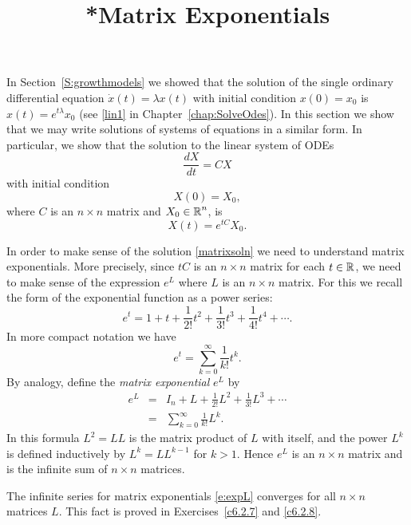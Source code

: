\documentclass{ximera}
\title{*Matrix Exponentials}
\begin{document}
\begin{abstract}
\end{abstract}
\maketitle


\label{S:Matrixexp} 

In Section~\ref{S:growthmodels} we showed that the solution of the single
ordinary differential equation $\dot x(t) = \lambda x(t)$ with initial
condition $x(0)=x_0$ is $x(t) = e^{t\lambda}x_0$ (see \eqref{lin1} in
Chapter~\ref{chap:SolveOdes}).  In this section we show that we
may write solutions of systems of equations in a similar form.
In particular, we show that the solution to the linear system of ODEs
\begin{equation}   \label{eq:x=Mx}
\frac{dX}{dt} = CX
\end{equation}
with initial condition
\[
X(0) = X_0,
\]
where $C$ is an $n\times n$ matrix and $X_0\in\mbox{$\Bbb{R}$}^n$, is
\begin{equation}  \label{matrixsoln}
X(t) = e^{tC}X_0.
\end{equation}

In order to make sense of the solution \eqref{matrixsoln} we need
to understand matrix exponentials. More precisely, since $tC$ is
an $n\times n$ matrix for each $t\in\mbox{$\Bbb{R}$}$, we need to make sense
of the expression $e^L$ where $L$ is an $n\times n$ matrix.  For
this we recall the form of the exponential function as a power
series:
\[
     e^t = 1 + t + \frac{1}{2!} t^2 + \frac{1}{3!} t^3
     + \frac{1}{4!} t^4 + \cdots .
\]
In more compact notation we have
\[
     e^t = \sum\limits_{k=0}^\infty \frac{1}{k!} t^k.
\]
By analogy, define the {\em matrix exponential\/}
$e^L$ by
\begin{eqnarray}
e^{L} & = & I_n + L + \frac{1}{2!} L^2 + \frac{1}{3!} L^3 +\cdots
\label{e:expL}\\
      & = & \sum\limits_{k=0}^\infty\frac{1}{k!} L^k. \nonumber
\end{eqnarray}
In this formula $L^2 = LL$ is the matrix product of $L$ with itself, and the
power $L^k$ is defined inductively by $L^k = LL^{k-1}$ for $k>1$.  Hence
$e^L$ is an $n\times n$ matrix and is the infinite sum of $n\times n$
matrices.

   The infinite series for matrix exponentials
\eqref{e:expL} converges for all $n\times n$ matrices $L$.  This fact
is proved in Exercises~\ref{c6.2.7} and \ref{c6.2.8}.
\end{document}
